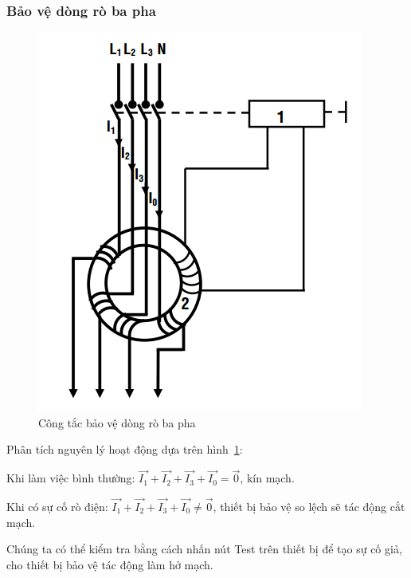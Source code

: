 \documentclass[13pt,a4paper]{extarticle}
\begin{document}
\subsubsection{Bảo vệ dòng rò ba pha}
\begin{figure}[!h]
\begin{center}
\includegraphics[scale=.7]{cong-tac-bve-ro-3pha.png} 
\end{center}
\caption{Công tắc bảo vệ dòng rò ba pha}\label{Fig:RCD3}
\end{figure}
Phân tích nguyên lý hoạt động dựa trên hình~\ref{Fig:RCD3}:
\begin{list}{--}{}
\item Khi làm việc bình thường: $\vec{I_1} + \vec{I_2} + \vec{I_3} + \vec{I_0} = \vec{0}$, kín mạch.
\item Khi có sự cố rò điện: $\vec{I_1} + \vec{I_2} + \vec{I_3} + \vec{I_0} \neq \vec{0}$, thiết bị bảo vệ so lệch sẽ tác động cắt mạch.
\end{list}

Chúng ta có thể kiểm tra bằng cách nhấn nút Test trên thiết bị để tạo sự cố giả, cho thiết bị bảo vệ tác động làm hở mạch.
\end{document}
